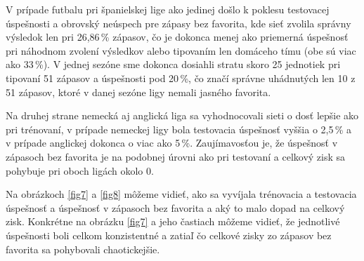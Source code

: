 V prípade futbalu pri španielskej lige ako jedinej došlo k poklesu testovacej úspešnosti a obrovský neúspech pre zápasy bez favorita, kde sieť zvolila správny výsledok len pri 26,86\,\% zápasov, čo je dokonca menej ako priemerná úspešnosť pri náhodnom zvolení výsledkov alebo tipovaním len domáceho tímu (obe sú viac ako 33\,\%).
V jednej sezóne sme dokonca dosiahli stratu skoro 25 jednotiek pri tipovaní 51 zápasov a úspešnosti pod 20\,\%, čo značí správne uhádnutých len 10 z 51 zápasov, ktoré v danej sezóne ligy nemali jasného favorita.

Na druhej strane nemecká aj anglická liga sa vyhodnocovali sieti o dosť lepšie ako pri trénovaní, v prípade nemeckej ligy bola testovacia úspešnosť vyššia o 2,5\,\% a v prípade anglickej dokonca o viac ako 5\,\%. Zaujímavosťou je, že úspešnosť v zápasoch bez favorita je na podobnej úrovni ako pri testovaní a celkový zisk sa pohybuje pri oboch ligách okolo 0.

Na obrázkoch \ref{fig7} a \ref{fig8} môžeme vidieť, ako sa vyvíjala trénovacia a testovacia úspešnosť a úspešnosť v zápasoch bez favorita a aký to malo dopad na celkový zisk. Konkrétne na obrázku \ref{fig7} a jeho častiach môžeme vidieť, že jednotlivé úspešnosti boli celkom konzistentné a zatiaľ čo celkové zisky zo zápasov bez favorita sa pohybovali chaotickejšie.


